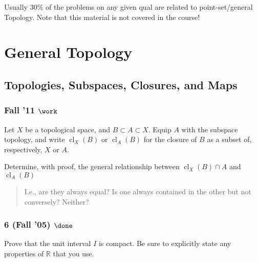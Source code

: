 \begin{warnings}

Usually 30\% of the problems on any given qual are related to
point-set/general Topology. Note that this material is not covered in
the course!

\end{warnings}

\hypertarget{general-topology}{%
\section{General Topology}\label{general-topology}}

\hypertarget{topologies-subspaces-closures-and-maps}{%
\subsection{Topologies, Subspaces, Closures, and
Maps}\label{topologies-subspaces-closures-and-maps}}

\hypertarget{fall-11-work}{%
\subsubsection{\texorpdfstring{Fall '11
\(\work\)}{Fall '11 \textbackslash work}}\label{fall-11-work}}

\begin{problem}[Fall 2011]

Let \(X\) be a topological space, and \(B \subset A \subset X\). Equip
\(A\) with the subspace topology, and write \(\operatorname{cl}_X (B)\)
or \(\operatorname{cl}_A (B)\) for the closure of \(B\) as a subset of,
respectively, \(X\) or \(A\).

Determine, with proof, the general relationship between
\(\operatorname{cl}_X (B) \cap A\) and \(\operatorname{cl}_A (B)\)

\begin{quote}
I.e., are they always equal? Is one always contained in the other but
not conversely? Neither?
\end{quote}

\end{problem}

\hypertarget{fall-05-done}{%
\subsubsection{\texorpdfstring{6 (Fall '05)
\(\done\)}{6 (Fall '05) \textbackslash done}}\label{fall-05-done}}

\begin{problem}[Fall 2005]

Prove that the unit interval \(I\) is compact. Be sure to explicitly
state any properties of \({\mathbb{R}}\) that you use.

\end{problem}

